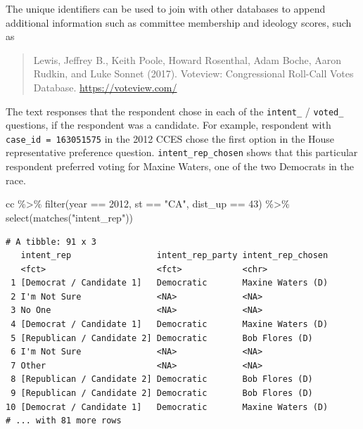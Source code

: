 \documentclass[10pt,article,oneside]{memoir}
\theoremstyle{definition}
\newenvironment{Shaded}{\begin{snugshade}}{\end{snugshade}}
\newcommand{\DecValTok}[1]{\textcolor[rgb]{0.00,0.00,0.81}{#1}}
\newcommand{\FunctionTok}[1]{\textcolor[rgb]{0.00,0.00,0.00}{#1}}
\newcommand{\NormalTok}[1]{#1}
\newcommand{\SpecialCharTok}[1]{\textcolor[rgb]{0.00,0.00,0.00}{#1}}
\newcommand{\StringTok}[1]{\textcolor[rgb]{0.31,0.60,0.02}{#1}}
\begin{document}
The unique identifiers can be used to join with other databases to
append additional information such as committee membership and ideology
scores, such as

\begin{quote}
Lewis, Jeffrey B., Keith Poole, Howard Rosenthal, Adam Boche, Aaron
Rudkin, and Luke Sonnet (2017). Voteview: Congressional Roll-Call Votes
Database. \url{https://voteview.com/}
\end{quote}

The text responses that the respondent chose in each of the
\texttt{intent\_} / \texttt{voted\_} questions, if the respondent was a
candidate. For example, respondent with \texttt{case\_id\ =\ 163051575}
in the 2012 CCES chose the first option in the House representative
preference question. \texttt{intent\_rep\_chosen} shows that this
particular respondent preferred voting for Maxine Waters, one of the two
Democrats in the race.

\begin{Shaded}
\begin{Highlighting}[]
\NormalTok{cc }\SpecialCharTok{\%\textgreater{}\%} 
  \FunctionTok{filter}\NormalTok{(year }\SpecialCharTok{==} \DecValTok{2012}\NormalTok{, st }\SpecialCharTok{==} \StringTok{"CA"}\NormalTok{, dist\_up }\SpecialCharTok{==} \DecValTok{43}\NormalTok{) }\SpecialCharTok{\%\textgreater{}\%} 
  \FunctionTok{select}\NormalTok{(}\FunctionTok{matches}\NormalTok{(}\StringTok{"intent\_rep"}\NormalTok{)) }
\end{Highlighting}
\end{Shaded}

\begin{verbatim}
# A tibble: 91 x 3
   intent_rep                 intent_rep_party intent_rep_chosen
   <fct>                      <fct>            <chr>            
 1 [Democrat / Candidate 1]   Democratic       Maxine Waters (D)
 2 I'm Not Sure               <NA>             <NA>             
 3 No One                     <NA>             <NA>             
 4 [Democrat / Candidate 1]   Democratic       Maxine Waters (D)
 5 [Republican / Candidate 2] Democratic       Bob Flores (D)   
 6 I'm Not Sure               <NA>             <NA>             
 7 Other                      <NA>             <NA>             
 8 [Republican / Candidate 2] Democratic       Bob Flores (D)   
 9 [Republican / Candidate 2] Democratic       Bob Flores (D)   
10 [Democrat / Candidate 1]   Democratic       Maxine Waters (D)
# ... with 81 more rows
\end{verbatim}
\end{document}
